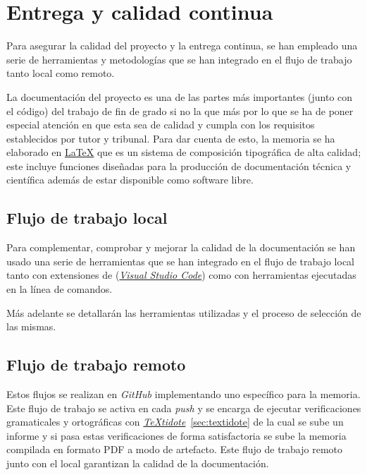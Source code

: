 \section{Entrega y calidad continua}

Para asegurar la calidad del proyecto y la entrega continua, se han empleado una serie de herramientas y metodologías que se han integrado en el flujo de trabajo tanto local como remoto.

La documentación del proyecto es una de las partes más importantes (junto con el código) del trabajo de fin de grado si no la que más por lo que se ha de poner especial atención en que esta sea de calidad y cumpla con los requisitos establecidos por tutor y tribunal. Para dar cuenta de esto, la memoria se ha elaborado en \href{https://www.latex-project.org/}{\LaTeX{}} que es un sistema de composición tipográfica de alta calidad; este incluye funciones diseñadas para la producción de documentación técnica y científica además de estar disponible como software libre.

\subsection{Flujo de trabajo local}

Para complementar, comprobar y mejorar la calidad de la documentación se han usado una serie de herramientas que se han integrado en el flujo de trabajo local tanto con extensiones de (\href{https://code.visualstudio.com/}{\textit{Visual Studio Code}}) como con herramientas ejecutadas en la línea de comandos.

Más adelante se detallarán las herramientas utilizadas y el proceso de selección de las mismas.

\subsection{Flujo de trabajo remoto}

Estos flujos se realizan en \textit{GitHub} implementando uno específico para la memoria. Este flujo de trabajo se activa en cada \textit{push} y se encarga de ejecutar verificaciones gramaticales y ortográficas con \href{https://github.com/sylvainhalle/textidote}{\textit{TeXtidote}}~\ref{sec:textidote} de la cual se sube un informe y si pasa estas verificaciones de forma satisfactoria se sube la memoria compilada en formato PDF a modo de artefacto. Este flujo de trabajo remoto junto con el local garantizan la calidad de la documentación.

